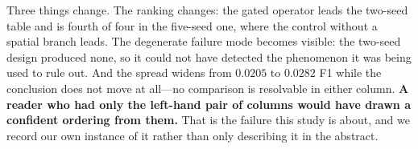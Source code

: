 \documentclass[journal]{IEEEtran}
\begin{document}
\begin{table}[!t]
  \caption{\textbf{[Cross-validation, 5 folds; left pair two seeds, right pair five]}~ The same comparison under two seed budgets. The ranking, the degenerate runs, and the spread all differ.}
  \label{tab:two_seed}
  \centering
  \footnotesize
\end{table}


Three things change. The ranking changes: the gated operator leads the two-seed table and is fourth of four in the five-seed one, where the control without a spatial branch leads. The degenerate failure mode becomes visible: the two-seed design produced none, so it could not have detected the phenomenon it was being used to rule out. And the spread widens from $0.0205$ to $0.0282$ F1 while the conclusion does not move at all---no comparison is resolvable in either column. \textbf{A reader who had only the left-hand pair of columns would have drawn a confident ordering from them.} That is the failure this study is about, and we record our own instance of it rather than only describing it in the abstract.


\end{document}
